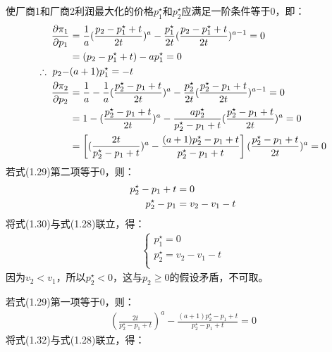 使厂商1和厂商2利润最大化的价格$p_1^{\star}$和$p_2^{\star}$应满足一阶条件等于0，即：
\begin{align}
    \frac{\partial \pi_1 }{\partial p_1} &=\frac{1}{a}(\frac{p_2-p_1^{\star}+t}{2t})^a -\frac{p_1^{\star}}{2t}(\frac{p_2-p_1^{\star}+t}{2t})^{a-1} =0\notag \\
    &=(p_2-p_1^{\star}+t)-ap_1^{\star} =0 \notag \\
    \therefore \ p_2- &(a+1)p_1^{\star}= -t \\
    \frac{\partial \pi_2 }{\partial p_2} &=\frac{1}{a}-\frac{1}{a}(\frac{p_2^{\star}-p_1+t}{2t})^a -\frac{p_2^{\star}}{2t}(\frac{p_2^{\star}-p_1+t}{2t})^{a-1} =0 \notag \\
    &=1-(\frac{p_2^{\star}-p_1+t}{2t})^a-\frac{ap_2^{\star}}{p_2^{\star}-p_1+t}(\frac{p_2^{\star}-p_1+t}{2t})^a=0 \notag \\
    &=\left[(\frac{2t}{p_2^{\star}-p_1+t})^a-\frac{(a+1)p_2^{\star}-p_1+t}{p_2^{\star}-p_1+t}\right](\frac{p_2^{\star}-p_1+t}{2t})^a=0 
\end{align}
若式(1.29)第二项等于0，则：
\begin{align}
    p_2^{\star}-p_1+t &= 0 \notag \\
    p_2^{\star}-p_1&=v_2-v_1-t 
\end{align}
将式(1.30)与式(1.28)联立，得：
\begin{align}
    \begin{cases}
     p_1^{\star} = 0 \\
     p_2^{\star} = v_2-v_1-t  \\
    \end{cases}
\end{align}
因为$v_2<v_1$，所以$p_2^{\star}<0$，这与$p_2\geq0$的假设矛盾，不可取。

若式(1.29)第一项等于0，则：
\begin{align}
    (\frac{2t}{p_2^{\star}-p_1+t})^a-\frac{(a+1)p_2^{\star}-p_1+t}{p_2^{\star}-p_1+t} = 0
\end{align}
将式(1.32)与式(1.28)联立，得：